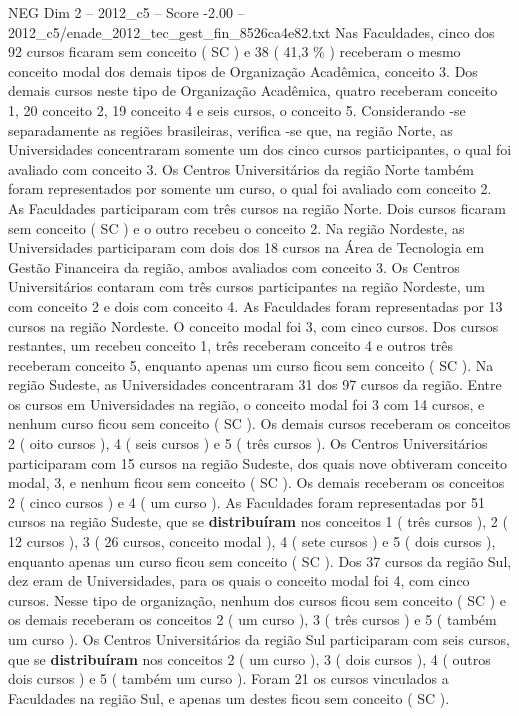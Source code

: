 \begin{textsample}{NEG Dim 2 – 2012\_c5 – Score -2.00 – 2012\_c5/enade\_2012\_tec\_gest\_fin\_8526ca4e82.txt}
Nas Faculdades, cinco dos 92 cursos ficaram sem conceito ( SC ) e 38 ( 41,3 \% ) receberam o mesmo conceito modal dos demais tipos de Organização Acadêmica, conceito 3.
Dos demais cursos neste tipo de Organização Acadêmica, quatro receberam conceito 1, 20 conceito 2, 19 conceito 4 e seis cursos, o conceito 5.
Considerando -se separadamente as regiões brasileiras, verifica -se que, na região Norte, as Universidades concentraram somente um dos cinco cursos participantes, o qual foi avaliado com conceito 3.
Os Centros Universitários da região Norte também foram representados por somente um curso, o qual foi avaliado com conceito 2.
As Faculdades participaram com três cursos na região Norte.
Dois cursos ficaram sem conceito ( SC ) e o outro recebeu o conceito 2.
Na região Nordeste, as Universidades participaram com dois dos 18 cursos na Área de Tecnologia em Gestão Financeira da região, ambos avaliados com conceito 3.
Os Centros Universitários contaram com três cursos participantes na região Nordeste, um com conceito 2 e dois com conceito 4.
As Faculdades foram representadas por 13 cursos na região Nordeste.
O conceito modal foi 3, com cinco cursos.
Dos cursos restantes, um recebeu conceito 1, três receberam conceito 4 e outros três receberam conceito 5, enquanto apenas um curso ficou sem conceito ( SC ).
Na região Sudeste, as Universidades concentraram 31 dos 97 cursos da região.
Entre os cursos em Universidades na região, o conceito modal foi 3 com 14 cursos, e nenhum curso ficou sem conceito ( SC ).
Os demais cursos receberam os conceitos 2 ( oito cursos ), 4 ( seis cursos ) e 5 ( três cursos ).
Os Centros Universitários participaram com 15 cursos na região Sudeste, dos quais nove obtiveram conceito modal, 3, e nenhum ficou sem conceito ( SC ).
Os demais receberam os conceitos 2 ( cinco cursos ) e 4 ( um curso ).
As Faculdades foram representadas por 51 cursos na região Sudeste, que se \textbf{distribuíram} nos conceitos 1 ( três cursos ), 2 ( 12 cursos ), 3 ( 26 cursos, conceito modal ), 4 ( sete cursos ) e 5 ( dois cursos ), enquanto apenas um curso ficou sem conceito ( SC ).
Dos 37 cursos da região Sul, dez eram de Universidades, para os quais o conceito modal foi 4, com cinco cursos.
Nesse tipo de organização, nenhum dos cursos ficou sem conceito ( SC ) e os demais receberam os conceitos 2 ( um curso ), 3 ( três cursos ) e 5 ( também um curso ).
Os Centros Universitários da região Sul participaram com seis cursos, que se \textbf{distribuíram} nos conceitos 2 ( um curso ), 3 ( dois cursos ), 4 ( outros dois cursos ) e 5 ( também um curso ).
Foram 21 os cursos vinculados a Faculdades na região Sul, e apenas um destes ficou sem conceito ( SC ).

\end{textsample}
